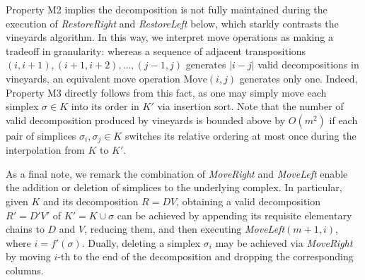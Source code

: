 \documentclass[sn-mathphys]{sn-jnl}
\begin{document}
Property M2 implies the decomposition is not fully maintained during the execution of \textit{RestoreRight} and \textit{RestoreLeft} below, which starkly contrasts the vineyards algorithm. 
In this way, we interpret move operations as making a tradeoff in granularity: whereas a sequence of adjacent transpositions $(i, i{+}1), (i{+}1, i{+}2), \dots, (j{-}1, j)$ generates $\lvert i - j \rvert $ valid decompositions in vineyards, an equivalent move operation $\mathrm{Move}(i,j)$ generates only one.
Indeed, Property M3 directly follows from this fact, as one may simply move each simplex $\sigma \in K$ into its order in $K'$ via insertion sort. Note that the number of valid decomposition produced by vineyards is bounded above by $O(m^2)$ if each pair of simplices $\sigma_i, \sigma_j \in K$ switches its relative ordering at most once during the interpolation from $K$ to $K'$.

As a final note, we remark the combination of \emph{MoveRight} and \emph{MoveLeft} enable the addition or deletion of simplices to the underlying complex. In particular, given $K$ and its decomposition $R = DV$, obtaining a valid decomposition $R' = D' V'$ of $K' = K \cup \sigma$ can be achieved by appending its requisite elementary chains to $D$ and $V$, reducing them, and then executing \emph{MoveLeft}$(m+1, i)$, where $i = f'(\sigma)$. Dually, deleting a simplex $\sigma_i$ may be achieved via \emph{MoveRight} by moving $i$-th to the end of the decomposition and dropping the corresponding columns. 

\end{document}
